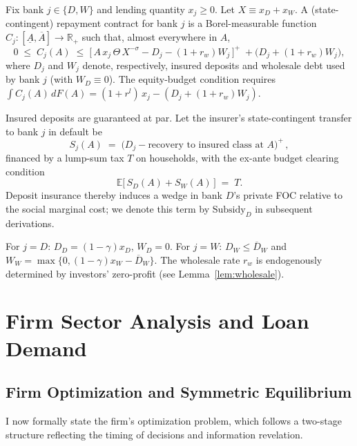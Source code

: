 \documentclass[12pt]{article}
\begin{document}
\begin{definition}\label{def:contractspace}
Fix bank $j\in\{D,W\}$ and lending quantity $x_j\ge 0$. Let $X\equiv x_D+x_W$. A (state-contingent) repayment contract for bank $j$ is a Borel-measurable function $C_j:[\underline A,\overline A]\to\mathbb R_+$ such that, almost everywhere in $A$,
\begin{equation}
0\;\le\; C_j(A)\;\le\; \big[\,A\,x_j\,\Theta\,X^{-\sigma} - D_j - (1+r_w)W_j\,\big]^+\;+
\big(D_j + (1+r_w)W_j\big),
\end{equation}
where $D_j$ and $W_j$ denote, respectively, insured deposits and wholesale debt used by bank $j$ (with $W_D\equiv 0$). The equity-budget condition requires $\int C_j(A)\,dF(A) = (1+r^l)\,x_j - (D_j + (1+r_w)W_j)$.

Insured deposits are guaranteed at par. Let the insurer's state-contingent transfer to bank $j$ in default be
\begin{equation}
S_j(A)\;=\;\big(D_j - \text{recovery to insured class at }A\big)^+\, ,
\end{equation}
financed by a lump-sum tax $T$ on households, with the ex-ante budget clearing condition
\begin{equation}
\mathbb E\big[\,S_D(A)+S_W(A)\,\big] \;=\; T.\label{eq:insurerBudget}
\end{equation}
Deposit insurance thereby induces a wedge in bank $D$'s private FOC relative to the social marginal cost; we denote this term by $\text{Subsidy}_D$ in subsequent derivations.
\end{definition}

\begin{remark}\label{rem:funding}
For $j=D$: $D_D=(1-\gamma)x_D$, $W_D=0$. For $j=W$: $D_W\le \overline D_W$ and $W_W = \max\{0,(1-\gamma)x_W - \overline D_W\}$. The wholesale rate $r_w$ is endogenously determined by investors' zero-profit (see Lemma~\ref{lem:wholesale}).
\end{remark}

\section{Firm Sector Analysis and Loan Demand}

\subsection{Firm Optimization and Symmetric Equilibrium}
I now formally state the firm's optimization problem, which follows a two-stage structure reflecting the timing of decisions and information revelation.
\end{document}
